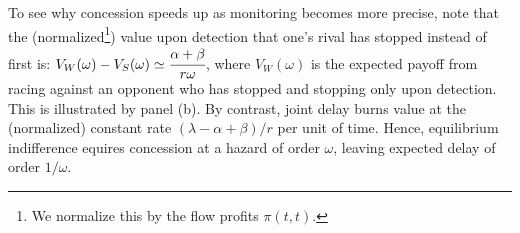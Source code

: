 \documentclass[12pt,reqno]{article}
\newcommand{\de}{\mathop{}\!\mathrm{d}}
\theoremstyle{definition} \newtheorem{example}{Example}
\theoremstyle{definition} \newtheorem{condition}{Condition}
\theoremstyle{definition} \newtheorem{corollary}{Corollary}
\theoremstyle{definition} \newtheorem{claim}{Claim}
\theoremstyle{definition} \newtheorem{definition}{Definition}
\theoremstyle{definition} \newtheorem{conjecture}{Conjecture}
\theoremstyle{definition} \newtheorem{Lemma}{Lemma}
\theoremstyle{definition} \newtheorem{lemma}{Lemma}
\theoremstyle{plain} \newtheorem{theorem}{Theorem}
\theoremstyle{definition} \newtheorem{assumption}{Assumption}
\theoremstyle{definition} \newtheorem*{assumptionnonumber}{Assumption}
\theoremstyle{definition} \newtheorem*{theoremNoNumber}{Proposition}
\theoremstyle{definition}
\theoremstyle{definition}\newtheorem{proposition}{Proposition}
\theoremstyle{definition} \newtheorem{result}{Result}
\theoremstyle{definition} \newtheorem*{definitionNoNumber}{Definition}
\theoremstyle{definition} \newtheorem{Definition}{Definition}
\theoremstyle{definition} \newtheorem*{DefinitionNoNumber}{Definition}
\theoremstyle{definition} \newtheorem*{fact}{Fact}
\theoremstyle{definition} \newtheorem*{property}{Property}
\theoremstyle{definition} \newtheorem{remark}{Remark}
\begin{document}
To see why concession speeds up as monitoring becomes more precise, note  that the  (normalized\footnote{We normalize this by the flow profits $\pi(t,t)$.}) value upon detection that one's rival has stopped instead of first is: 
$
V_W(\omega) - V_S(\omega) \simeq \cfrac{\alpha + \beta}{r\omega}$,
where $V_W(\omega)$ is the expected payoff from racing against an opponent who has stopped and stopping only upon detection. This is illustrated by panel (b). By contrast, joint delay burns value at the (normalized) constant rate $(\lambda-\alpha+\beta)/r$ per unit of time. Hence,  equilibrium indifference equires concession at a hazard of order $\omega$, leaving expected delay of order
$1/\omega$.




\end{document}
